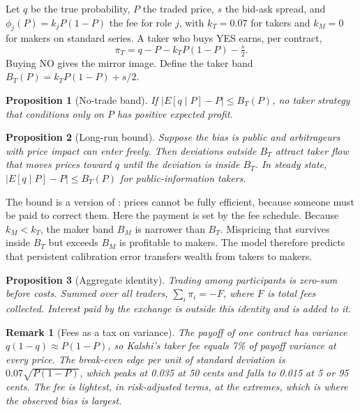 \documentclass[11pt]{article}
\newtheorem{proposition}{Proposition}
\newtheorem*{remark}{Remark}
\begin{document}
Let $q$ be the true probability, $P$ the traded price, $s$ the bid-ask spread, and $\phi_j(P)=k_j P(1-P)$ the fee for role $j$, with $k_T = 0.07$ for takers and $k_M=0$ for makers on standard series. A taker who buys YES earns, per contract,
\begin{equation}
\pi_T = q - P - k_T P(1-P) - \tfrac{s}{2}.
\end{equation}
Buying NO gives the mirror image. Define the taker band $B_T(P)=k_T P(1-P)+s/2$.

\begin{proposition}[No-trade band]
If $|E[q\mid P]-P| \le B_T(P)$, no taker strategy that conditions only on $P$ has positive expected profit.
\end{proposition}

\begin{proposition}[Long-run bound]
Suppose the bias is public and arbitrageurs with price impact can enter freely. Then deviations outside $B_T$ attract taker flow that moves prices toward $q$ until the deviation is inside $B_T$. In steady state, $|E[q\mid P]-P| \le B_T(P)$ for public-information takers.
\end{proposition}

The bound is a version of \citet{grossman1980}: prices cannot be fully efficient, because someone must be paid to correct them. Here the payment is set by the fee schedule. Because $k_M < k_T$, the maker band $B_M$ is narrower than $B_T$. Mispricing that survives inside $B_T$ but exceeds $B_M$ is profitable to makers. The model therefore predicts that persistent calibration error transfers wealth from takers to makers.

\begin{proposition}[Aggregate identity]
Trading among participants is zero-sum before costs. Summed over all traders, $\sum_i \pi_i = -F$, where $F$ is total fees collected. Interest paid by the exchange is outside this identity and is added to it.
\end{proposition}

\begin{remark}[Fees as a tax on variance]
The payoff of one contract has variance $q(1-q)\approx P(1-P)$, so Kalshi's taker fee equals 7\% of payoff variance at every price. The break-even edge per unit of standard deviation is $0.07\sqrt{P(1-P)}$, which peaks at 0.035 at 50 cents and falls to 0.015 at 5 or 95 cents. The fee is lightest, in risk-adjusted terms, at the extremes, which is where the observed bias is largest.
\end{remark}
\end{document}
